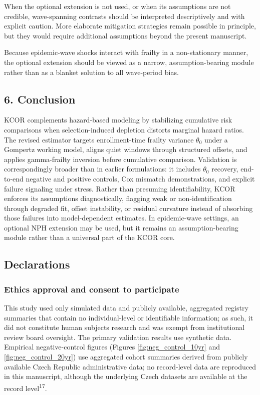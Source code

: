 \documentclass[
]{article}
\begin{document}
When the optional extension is not used, or when its assumptions are not
credible, wave-spanning contrasts should be interpreted descriptively
and with explicit caution. More elaborate mitigation strategies remain
possible in principle, but they would require additional assumptions
beyond the present manuscript.

Because epidemic-wave shocks interact with frailty in a non-stationary
manner, the optional extension should be viewed as a narrow,
assumption-bearing module rather than as a blanket solution to all
wave-period bias.

\subsection{6. Conclusion}\label{conclusion}

KCOR complements hazard-based modeling by stabilizing cumulative risk
comparisons when selection-induced depletion distorts marginal hazard
ratios. The revised estimator targets enrollment-time frailty variance
\(\theta_0\) under a Gompertz working model, aligns quiet windows
through structured offsets, and applies gamma-frailty inversion before
cumulative comparison. Validation is correspondingly broader than in
earlier formulations: it includes \(\theta_0\) recovery, end-to-end
negative and positive controls, Cox mismatch demonstrations, and
explicit failure signaling under stress. Rather than presuming
identifiability, KCOR enforces its assumptions diagnostically, flagging
weak or non-identification through degraded fit, offset instability, or
residual curvature instead of absorbing those failures into
model-dependent estimates. In epidemic-wave settings, an optional NPH
extension may be used, but it remains an assumption-bearing module
rather than a universal part of the KCOR core.

\newpage

\subsection{Declarations}\label{declarations}

\subsubsection{Ethics approval and consent to
participate}\label{ethics-approval-and-consent-to-participate}

This study used only simulated data and publicly available, aggregated
registry summaries that contain no individual-level or identifiable
information; as such, it did not constitute human subjects research and
was exempt from institutional review board oversight. The primary
validation results use synthetic data. Empirical negative-control
figures (Figures \ref{fig:neg_control_10yr} and
\ref{fig:neg_control_20yr}) use aggregated cohort summaries derived from
publicly available Czech Republic administrative data; no record-level
data are reproduced in this manuscript, although the underlying Czech
datasets are available at the record level\textsuperscript{17}.
\end{document}
